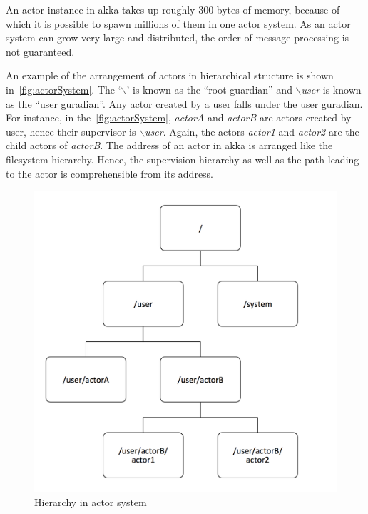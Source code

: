   An actor instance in akka takes up roughly 300 bytes of memory, because of which it is possible to spawn millions of them in one actor system. As an actor system can grow very large and distributed, the order of message processing is not guaranteed.~\cite{akkaJavaDoc}

  An example of the arrangement of actors in hierarchical structure is shown in~\autoref{fig:actorSystem}. The ‘{$\backslash$}’ is known as the “root guardian” and \emph{$\backslash$user} is known as the “user guradian”. Any actor created by a user falls under the user guradian. For instance, in the~\autoref{fig:actorSystem}, \emph{actorA} and \emph{actorB} are actors created by user, hence their supervisor is \emph{$\backslash$user}. Again, the actors \emph{actor1} and \emph{actor2} are the child actors of \emph{actorB}. The address of an actor in akka is arranged like the filesystem hierarchy. Hence, the supervision hierarchy as well as the path leading to the actor is comprehensible from its address.

\begin{figure}[H]
  \centering
  \includegraphics[scale=0.5]{figures/actorSystem}
  \caption[Hierarchy in actor system]{Hierarchy in actor system~\cite{akkaJavaDoc}}
  \label{fig:actorSystem}
\end{figure}

